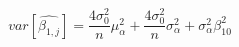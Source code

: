 \begin{equation}
var[\hat{\beta_{1,j}}] = \frac{4\sigma_0^2}{n}\mu_{\alpha}^2 + \frac{4\sigma_0^2}{n}\sigma_{\alpha}^2 + \sigma_{\alpha}^2\beta_{10}^2
\end{equation}
